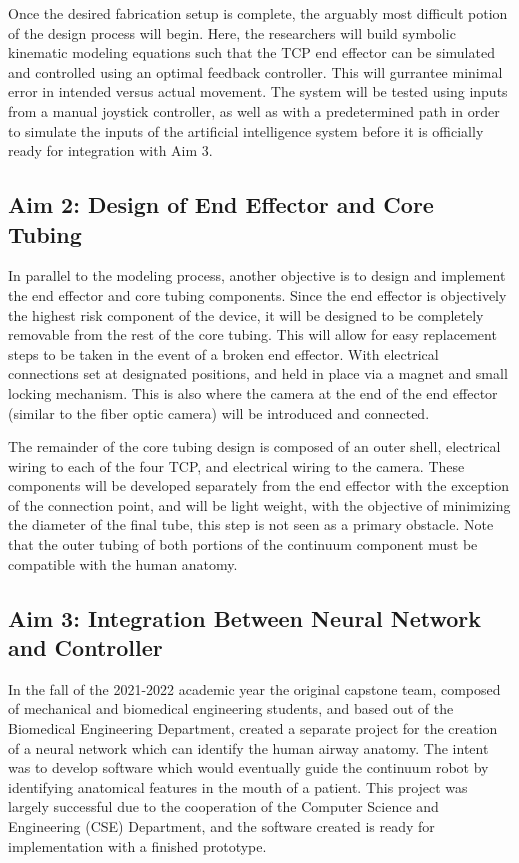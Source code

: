 		Once the desired fabrication setup is complete, the arguably most difficult potion of the design process will begin. Here, the researchers will build symbolic kinematic modeling equations such that the TCP end effector can be simulated and controlled using an optimal feedback controller. This will gurrantee minimal error in intended versus actual movement. The system will be tested using inputs from a manual joystick controller, as well as with a predetermined path in order to simulate the inputs of the artificial intelligence system before it is officially ready for integration with Aim 3.
	
	\subsection{Aim 2: Design of End Effector and Core Tubing}
	\label{subsect:aim2}
	
		In parallel to the modeling process, another objective is to design and implement the end effector and core tubing components. Since the end effector is objectively the highest risk component of the device, it will be designed to be completely removable from the rest of the core tubing. This will allow for easy replacement steps to be taken in the event of a broken end effector. With electrical connections set at designated positions, and held in place via a magnet and small locking mechanism.	 This is also where the camera at the end of the end effector (similar to the fiber optic camera) will be introduced and connected.
	
		The remainder of the core tubing design is composed of an outer shell, electrical wiring to each of the four TCP, and electrical wiring to the camera. These components will be developed separately from the end effector with the exception of the connection point, and will be light weight, with the objective of minimizing the diameter of the final tube, this step is not seen as a primary obstacle. Note that the outer tubing of both portions of the continuum component must be compatible with the human anatomy.
	
	\subsection{Aim 3: Integration Between Neural Network and Controller}
	\label{subsect:aim3}
	
		In the fall of the 2021-2022 academic year the original capstone team, composed of mechanical and biomedical engineering students, and based out of the Biomedical Engineering Department, created a separate project for the creation of a neural network which can identify the human airway anatomy. The intent was to develop software which would eventually guide the continuum robot by identifying anatomical features in the mouth of a patient. This project was largely successful due to the cooperation of the Computer Science and Engineering (CSE) Department, and the software created is ready for implementation with a finished prototype.
	
